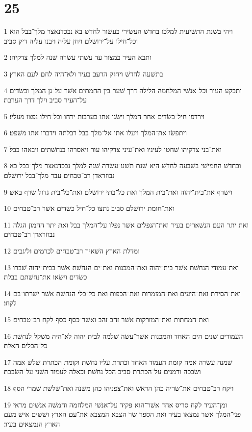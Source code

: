 \chapter{25}

\par 1 ויהי בשׁנת התשׁיעית למלכו בחדשׁ העשׂירי בעשׂור לחדשׁ בא נבכדנאצר מלך־בבל הוא וכל־חילו על־ירושׁלם ויחן עליה ויבנו עליה דיק סביב׃
\par 2 ותבא העיר במצור עד עשׁתי עשׂרה שׁנה למלך צדקיהו׃
\par 3 בתשׁעה לחדשׁ ויחזק הרעב בעיר ולא־היה לחם לעם הארץ׃
\par 4 ותבקע העיר וכל־אנשׁי המלחמה הלילה דרך שׁער בין החמתים אשׁר על־גן המלך וכשׂדים על־העיר סביב וילך דרך הערבה׃
\par 5 וירדפו חיל־כשׂדים אחר המלך וישׂגו אתו בערבות ירחו וכל־חילו נפצו מעליו׃
\par 6 ויתפשׂו את־המלך ויעלו אתו אל־מלך בבל רבלתה וידברו אתו משׁפט׃
\par 7 ואת־בני צדקיהו שׁחטו לעיניו ואת־עיני צדקיהו עור ויאסרהו בנחשׁתים ויבאהו בבל׃
\par 8 ובחדשׁ החמישׁי בשׁבעה לחדשׁ היא שׁנת תשׁע־עשׂרה שׁנה למלך נבכדנאצר מלך־בבל בא נבוזראדן רב־טבחים עבד מלך־בבל ירושׁלם׃
\par 9 וישׂרף את־בית־יהוה ואת־בית המלך ואת כל־בתי ירושׁלם ואת־כל־בית גדול שׂרף באשׁ׃
\par 10 ואת־חומת ירושׁלם סביב נתצו כל־חיל כשׂדים אשׁר רב־טבחים׃
\par 11 ואת יתר העם הנשׁארים בעיר ואת־הנפלים אשׁר נפלו על־המלך בבל ואת יתר ההמון הגלה נבוזראדן רב־טבחים׃
\par 12 ומדלת הארץ השׁאיר רב־טבחים לכרמים וליגבים׃
\par 13 ואת־עמודי הנחשׁת אשׁר בית־יהוה ואת־המכנות ואת־ים הנחשׁת אשׁר בבית־יהוה שׁברו כשׂדים וישׂאו את־נחשׁתם בבלה׃
\par 14 ואת־הסירת ואת־היעים ואת־המזמרות ואת־הכפות ואת כל־כלי הנחשׁת אשׁר ישׁרתו־בם לקחו׃
\par 15 ואת־המחתות ואת־המזרקות אשׁר זהב זהב ואשׁר־כסף כסף לקח רב־טבחים׃
\par 16 העמודים שׁנים הים האחד והמכנות אשׁר־עשׂה שׁלמה לבית יהוה לא־היה משׁקל לנחשׁת כל־הכלים האלה׃
\par 17 שׁמנה עשׂרה אמה קומת העמוד האחד וכתרת עליו נחשׁת וקומת הכתרת שׁלשׁ אמה ושׂבכה ורמנים על־הכתרת סביב הכל נחשׁת וכאלה לעמוד השׁני על־השׂבכה׃
\par 18 ויקח רב־טבחים את־שׂריה כהן הראשׁ ואת־צפניהו כהן משׁנה ואת־שׁלשׁת שׁמרי הסף׃
\par 19 ומן־העיר לקח סריס אחד אשׁר־הוא פקיד על־אנשׁי המלחמה וחמשׁה אנשׁים מראי פני־המלך אשׁר נמצאו בעיר ואת הספר שׂר הצבא המצבא את־עם הארץ ושׁשׁים אישׁ מעם הארץ הנמצאים בעיר׃
